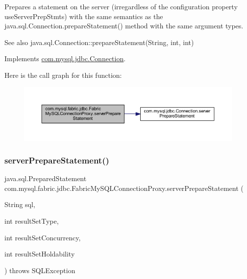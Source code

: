 Prepares a statement on the server (irregardless of the configuration property \textquotesingle{}use\+Server\+Prep\+Stmts\textquotesingle{}) with the same semantics as the java.\+sql.\+Connection.\+prepare\+Statement() method with the same argument types.

\begin{DoxySeeAlso}{See also}
java.\+sql.\+Connection\+::prepare\+Statement(\+String, int, int) 
\end{DoxySeeAlso}


Implements \mbox{\hyperlink{interfacecom_1_1mysql_1_1jdbc_1_1_connection_acda6552c537e45e1d46a1d8e21beefe3}{com.\+mysql.\+jdbc.\+Connection}}.

Here is the call graph for this function\+:\nopagebreak
\begin{figure}[H]
\begin{center}
\leavevmode
\includegraphics[width=350pt]{classcom_1_1mysql_1_1fabric_1_1jdbc_1_1_fabric_my_s_q_l_connection_proxy_a10da05d178dc0a7d035a65c68996c48c_cgraph}
\end{center}
\end{figure}
\mbox{\label{classcom_1_1mysql_1_1fabric_1_1jdbc_1_1_fabric_my_s_q_l_connection_proxy_a2465abeeee2f1a83f9a2632f3c577a6b}} 
\subsubsection{\texorpdfstring{server\+Prepare\+Statement()}{serverPrepareStatement()}\hspace{0.1cm}{\footnotesize\ttfamily [4/6]}}
{\footnotesize\ttfamily java.\+sql.\+Prepared\+Statement com.\+mysql.\+fabric.\+jdbc.\+Fabric\+My\+S\+Q\+L\+Connection\+Proxy.\+server\+Prepare\+Statement (\begin{DoxyParamCaption}\item[{String}]{sql,  }\item[{int}]{result\+Set\+Type,  }\item[{int}]{result\+Set\+Concurrency,  }\item[{int}]{result\+Set\+Holdability }\end{DoxyParamCaption}) throws S\+Q\+L\+Exception}

